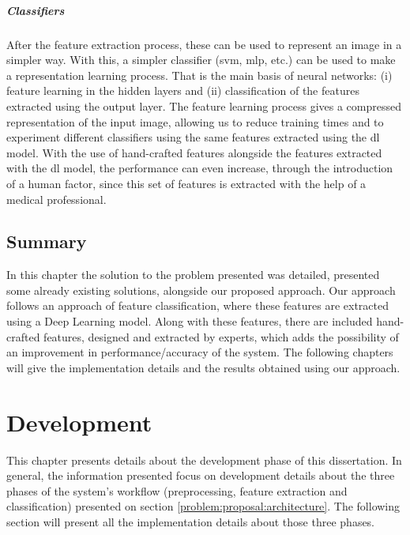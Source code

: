 \documentclass[
  twoside,
  11pt, a4paper,
  footinclude=true,
  headinclude=true,
  cleardoublepage=empty
]{scrbook}
\begin{document}
        \paragraph{Classifiers}
          After the feature extraction process, these can be used to represent an image in a simpler way. With this, a simpler classifier (\gls{svm}, \gls{mlp}, etc.) can be used to make a representation learning process. That is the main basis of neural networks: (i) feature learning in the hidden layers and (ii) classification of the features extracted using the output layer. The feature learning process gives a compressed representation of the input image, allowing us to reduce training times and to experiment different classifiers using the same features extracted using the \gls{dl} model. With the use of hand-crafted features alongside the features extracted with the \gls{dl} model, the performance can even increase, through the introduction of a human factor, since this set of features is extracted with the help of a medical professional.

    \section{Summary} \label{problem:summary}
      In this chapter the solution to the problem presented was detailed, presented some already existing solutions, alongside our proposed approach. Our approach follows an approach of feature classification, where these features are extracted using a Deep Learning model. Along with these features, there are included hand-crafted features, designed and extracted by experts, which adds the possibility of an improvement in performance/accuracy of the system. The following chapters will give the implementation details and the results obtained using our approach.

  \chapter{Development} \label{development}
    This chapter presents details about the development phase of this dissertation. In general, the information presented focus on development details about the three phases of the system's workflow (preprocessing, feature extraction and classification) presented on section \ref{problem:proposal:architecture}. The following section will present all the implementation details about those three phases.
\end{document}
